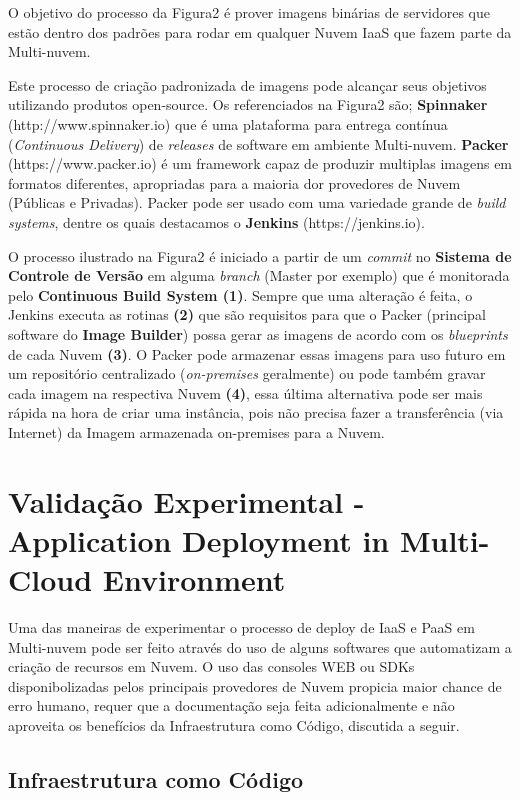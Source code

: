 \documentclass[12pt]{article}
\begin{document}
	O objetivo do processo da Figura2 é prover imagens binárias de servidores que estão dentro dos padrões para rodar em qualquer Nuvem IaaS que fazem parte da Multi-nuvem.
	
	Este processo de criação padronizada de imagens pode alcançar seus objetivos utilizando produtos open-source. Os referenciados na Figura2 são; \textbf{Spinnaker} (http://www.spinnaker.io) que é uma plataforma para entrega contínua (\textit{Continuous Delivery}) de \textit{releases} de software em ambiente Multi-nuvem. \textbf{Packer} (https://www.packer.io) é um framework capaz de produzir multiplas imagens em formatos diferentes, apropriadas para a maioria dor provedores de Nuvem (Públicas e Privadas). Packer pode ser usado com uma variedade grande de \textit{build systems}, dentre os quais destacamos o \textbf{Jenkins} (https://jenkins.io).

	O processo ilustrado na Figura2 é iniciado a partir de um \textit{commit} no \textbf{Sistema de Controle de Versão} em alguma \textit{branch} (Master por exemplo) que é monitorada pelo \textbf{Continuous Build System (1)}. Sempre que uma alteração é feita, o Jenkins executa as rotinas \textbf{(2)} que são requisitos para que o Packer (principal software do \textbf{Image Builder}) possa gerar as imagens de acordo com os \textit{blueprints} de cada Nuvem \textbf{(3)}. O Packer pode armazenar essas imagens para uso futuro em um repositório centralizado (\textit{on-premises} geralmente) ou pode também gravar cada imagem na respectiva Nuvem \textbf{(4)}, essa última alternativa pode ser mais rápida na hora de criar uma instância, pois não precisa fazer a transferência (via Internet) da Imagem armazenada on-premises para a Nuvem.
	
	\section{Validação Experimental - Application Deployment in Multi-Cloud Environment}
	
	Uma das maneiras de experimentar o processo de deploy de IaaS e PaaS em Multi-nuvem pode ser feito através do uso de alguns softwares que automatizam a criação de recursos em Nuvem. O uso das consoles WEB ou SDKs disponibolizadas pelos principais provedores de Nuvem propicia maior chance de erro humano, requer que a documentação seja feita adicionalmente e não aproveita os benefícios da Infraestrutura como Código, discutida a seguir.  
	
	\subsection{Infraestrutura como Código}
	
\end{document}
